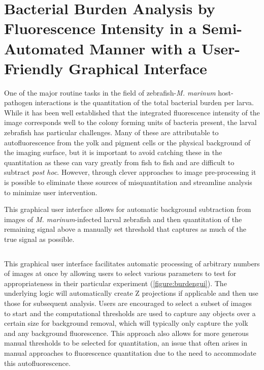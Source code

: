 \section{Bacterial Burden Analysis by Fluorescence Intensity in a Semi\hyp{}Automated Manner with a User\hyp{}Friendly Graphical Interface}

One of the major routine tasks in the field of zebrafish\hyp{}\textit{M. marinum} host\hyp{}pathogen interactions is the quantitation of the total bacterial burden per larva. While it has been well established that the integrated fluorescence intensity of the image corresponds well to the colony forming units of bacteria present, the larval zebrafish has particular challenges. Many of these are attributable to autofluorescence from the yolk and pigment cells or the physical background of the imaging surface, but it is important to avoid catching these in the quantitation as these can vary greatly from fish to fish and are difficult to subtract \textit{post hoc}. However, through clever approaches to image pre\hyp{}processing it is possible to eliminate these sources of misquantitation and streamline analysis to minimize user intervention.

\begin{code}
\caption{This graphical user interface allows for automatic background subtraction from images of \textit{M. marinum}\hyp{}infected larval zebrafish and then quantitation of the remaining signal above a manually set threshold that captures as much of the true signal as possible.}
\label{burden}

\inputminted[breaklines,frame=single,fontsize=\small]{python}{source/burdenMeasurer.py}

\end{code}

This graphical user interface facilitates automatic processing of arbitrary numbers of images at once by allowing users to select various parameters to test for appropriateness in their particular experiment (\autoref{figure:burdengui}). The underlying logic will automatically create Z projections if applicable and then use those for subsequent analysis. Users are encouraged to select a subset of images to start and the computational thresholds are used to capture any objects over a certain size for background removal, which will typically only capture the yolk and any background fluorescence. This approach also allows for more generous manual thresholds to be selected for quantitation, an issue that often arises in manual approaches to fluorescence quantitation due to the need to accommodate this autofluorescence. 

